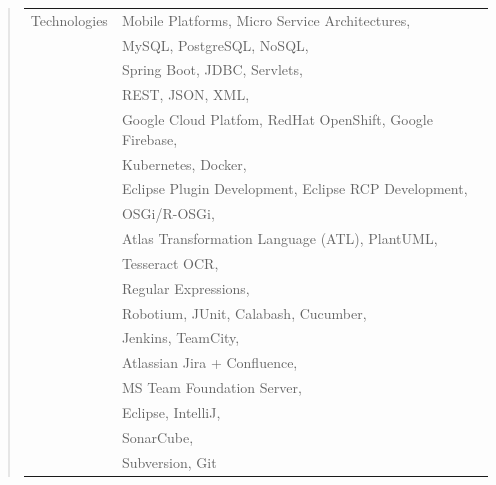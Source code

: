 \fi
%
\ifshowKenntnisseTech
\begin{quote}
	\begin{tabular}{p{4cm}l}
		Technologies&Mobile Platforms, Micro Service Architectures,\\
		&MySQL, PostgreSQL, NoSQL,\\
		&Spring Boot, JDBC, Servlets,\\
		&REST, JSON, XML,\\
		&Google Cloud Platfom, RedHat OpenShift, Google Firebase,\\
		&Kubernetes, Docker,\\
		&Eclipse Plugin Development, Eclipse RCP Development,\\
		&OSGi/R-OSGi,\\
		&Atlas Transformation Language (ATL), PlantUML,\\
		&Tesseract OCR,\\
		&Regular Expressions,\\
		&Robotium, JUnit, Calabash, Cucumber,\\
		&Jenkins, TeamCity,\\
		&Atlassian Jira + Confluence,\\
		&MS Team Foundation Server,\\
		&Eclipse, IntelliJ,\\
		&SonarCube,\\
		&Subversion, Git 
	\end{tabular}
\end{quote}